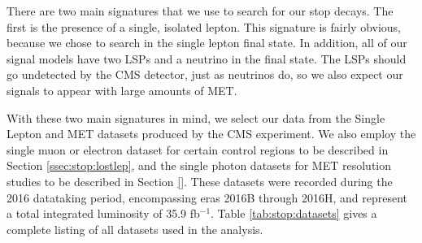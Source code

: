 There are two main signatures that we use to search for our stop
decays. The first is the presence of a single, isolated lepton. This
signature is fairly obvious, because we chose to search in the single
lepton final state. In addition, all of our signal models have two
LSPs and a neutrino in the final state. The LSPs should go undetected
by the CMS detector, just as neutrinos do, so we also expect our
signals to appear with large amounts of MET.

With these two main signatures in mind, we select our data from the
Single Lepton and MET datasets produced by the CMS
experiment. We also employ the single muon or electron dataset for certain control
regions to be described in Section \ref{ssec:stop:lostlep}, and the
single photon datasets for MET resolution studies to be %
described in Section \ref{}. These datasets were recorded during the
2016 datataking period, encompassing eras 2016B through 2016H, and
represent a total integrated luminosity of 35.9 fb$^{-1}$. Table
\ref{tab:stop:datasets} gives a complete listing of all datasets used
in the analysis.

